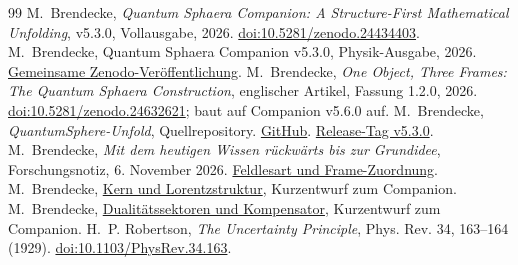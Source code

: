 \documentclass[11pt,a4paper]{article}
\begin{document}
\clearpage
\begingroup
\small
\raggedright
\begin{thebibliography}{99}
\setlength{\itemsep}{0.25\baselineskip}
M.~Brendecke, \emph{Quantum Sphaera Companion: A Structure-First Mathematical Unfolding}, v5.3.0, Vollausgabe, 2026.
\href{https://doi.org/10.5281/zenodo.24434403}{doi:10.5281/zenodo.24434403}.
M.~Brendecke, Quantum Sphaera Companion v5.3.0, Physik-Ausgabe, 2026.
\href{https://doi.org/10.5281/zenodo.24434403}{Gemeinsame Zenodo-Veröffentlichung}.
M.~Brendecke, \emph{One Object, Three Frames: The Quantum Sphaera Construction}, englischer Artikel, Fassung 1.2.0, 2026.
\href{https://doi.org/10.5281/zenodo.24632621}{doi:10.5281/zenodo.24632621}; baut auf Companion v5.6.0 auf.
M.~Brendecke, \emph{QuantumSphere-Unfold}, Quellrepository.
\href{https://github.com/Moriarty1982/QuantumSphere-Unfold}{GitHub}.
\href{https://github.com/Moriarty1982/QuantumSphere-Unfold/tree/v5.3.0}{Release-Tag v5.3.0}.
M.~Brendecke, \emph{Mit dem heutigen Wissen rückwärts bis zur Grundidee}, Forschungsnotiz, 6. November 2026.
\href{https://github.com/Moriarty1982/QuantumSphere-Unfold/blob/d2020d178a483d1baa7be3871ca2e9d597992059/notes/research/qsc_back_to_basic_idea_2026_11_06.md}{Feldlesart und Frame-Zuordnung}.
M.~Brendecke, \href{https://github.com/Moriarty1982/QuantumSphere-Unfold/blob/d2020d178a483d1baa7be3871ca2e9d597992059/paper/short/p2_kernel.tex}{Kern und Lorentzstruktur}, Kurzentwurf zum Companion.
M.~Brendecke, \href{https://github.com/Moriarty1982/QuantumSphere-Unfold/blob/d2020d178a483d1baa7be3871ca2e9d597992059/paper/short/p3_frames.tex}{Dualitätssektoren und Kompensator}, Kurzentwurf zum Companion.
H.~P. Robertson, \emph{The Uncertainty Principle}, Phys. Rev. 34, 163--164 (1929).
\href{https://doi.org/10.1103/PhysRev.34.163}{doi:10.1103/PhysRev.34.163}.


\end{thebibliography}
\end{document}
